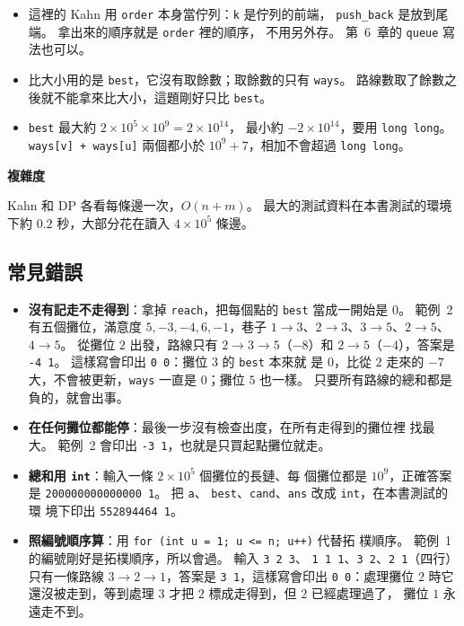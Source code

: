 
\begin{itemize}
\item 這裡的 Kahn 用 \texttt{order} 本身當佇列：\texttt{k} 是佇列的前端，
\texttt{push\_back} 是放到尾端。 拿出來的順序就是 \texttt{order} 裡的順序，
不用另外存。 第~6~章的 \texttt{queue} 寫法也可以。
\item 比大小用的是 \texttt{best}，它沒有取餘數；取餘數的只有 \texttt{ways}。
路線數取了餘數之後就不能拿來比大小，這題剛好只比 \texttt{best}。
\item \texttt{best} 最大約 $2 \times 10^5 \times 10^9 = 2 \times 10^{14}$，
最小約 $-2 \times 10^{14}$，要用 \texttt{long long}。 \texttt{ways[v] + ways[u]}
兩個都小於 $10^9 + 7$，相加不會超過 \texttt{long long}。
\end{itemize}

\textbf{複雜度}

Kahn 和 DP 各看每條邊一次，$O(n + m)$。 最大的測試資料在本書測試的環境下約
$0.2$ 秒，大部分花在讀入 $4 \times 10^5$ 條邊。

\subsection{常見錯誤}

\begin{itemize}
\item \textbf{沒有記走不走得到}：拿掉 \texttt{reach}，把每個點的 \texttt{best}
當成一開始是 $0$。 範例~2 有五個攤位，滿意度 $5, -3, -4, 6, -1$，巷子
$1 \to 3$、$2 \to 3$、$3 \to 5$、$2 \to 5$、$4 \to 5$。 從攤位 $2$ 出發，路線只有 $2 \to 3 \to 5$（$-8$）和 $2 \to 5$（$-4$），答案是
\texttt{-4 1}。 這樣寫會印出 \texttt{0 0}：攤位 $3$ 的 \texttt{best} 本來就
是 $0$，比從 $2$ 走來的 $-7$ 大，不會被更新，\texttt{ways} 一直是 $0$；攤位
$5$ 也一樣。 只要所有路線的總和都是負的，就會出事。
\item \textbf{在任何攤位都能停}：最後一步沒有檢查出度，在所有走得到的攤位裡
找最大。 範例~2 會印出 \texttt{-3 1}，也就是只買起點攤位就走。
\item \textbf{總和用 \texttt{int}}：輸入一條 $2 \times 10^5$ 個攤位的長鏈、每
個攤位都是 $10^9$，正確答案是 \texttt{200000000000000 1}。 把 \texttt{a}、
\texttt{best}、\texttt{cand}、\texttt{ans} 改成 \texttt{int}，在本書測試的環
境下印出 \texttt{552894464 1}。
\item \textbf{照編號順序算}：用 \texttt{for (int u = 1; u <= n; u++)} 代替拓
樸順序。 範例~1 的編號剛好是拓樸順序，所以會過。 輸入 \texttt{3 2 3}、
\texttt{1 1 1}、\texttt{3 2}、\texttt{2 1}（四行）只有一條路線
$3 \to 2 \to 1$，答案是 \texttt{3 1}，這樣寫會印出 \texttt{0 0}：處理攤位
$2$ 時它還沒被走到，等到處理 $3$ 才把 $2$ 標成走得到，但 $2$ 已經處理過了，
攤位 $1$ 永遠走不到。
\end{itemize}


